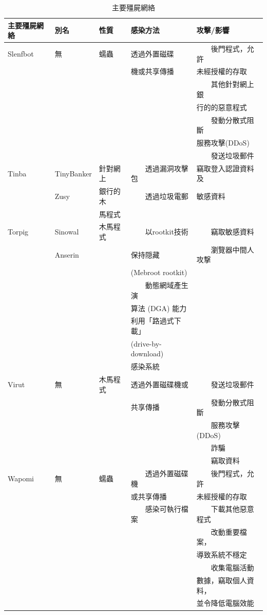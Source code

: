 \documentclass[14pt]{extarticle}
\newcommand{\tabitem}{~~\llap{\textbullet}~~}
\begin{document}
\begin{table}[!htbp]
\centering
\caption{主要殭屍網絡}
\begin{tabular}{lllll} \hline
\bf 主要殭屍網絡 & \bf 別名 & \bf 性質 & \bf 感染方法 & \bf 攻擊/影響\\\hline
Slenfbot &	無 &	蠕蟲	& 透過外置磁碟 & \tabitem 後門程式，允許 \\
 &&& 機或共享傳播 &未經授權的存取\\
  &&&& \tabitem 其他針對網上銀\\
  &&&& 行的的惡意程式\\
&&&& \tabitem 發動分散式阻斷 \\
&&&& 服務攻擊(DDoS) \\
&&&& \tabitem 發送垃圾郵件 \\\hline
Tinba	&	TinyBanker & 針對網上 & \tabitem 透過漏洞攻擊包 & 竊取登入認證資料及 \\
&	Zusy& 	銀行的木 & \tabitem 透過垃圾電郵 & 敏感資料 \\
& & 馬程式 \\\hline
Torpig	&	Sinowal &木馬程式 & \tabitem 以rootkit技術 & \tabitem 竊取敏感資料 \\
& Anserin	& & 保持隠藏 & \tabitem 瀏覽器中間人攻撃 \\
& & & (Mebroot rootkit)\\
& & & \tabitem 動態網域產生演 \\
& & & 算法 (DGA) 能力\\
&&& 利用「路過式下載」\\
&&& (drive-by-download) \\
&&& 感染系統	\\\hline
Virut & 無	& 木馬程式	& 透過外置磁碟機或 & \tabitem 發送垃圾郵件 \\
 &&& 共享傳播 & \tabitem 發動分散式阻斷 \\
&&&& \tabitem 服務攻擊(DDoS) \\
&&&& \tabitem	詐騙 \\
&&&& \tabitem 竊取資料 \\\hline	
Wapomi	& 無	& 蠕蟲	& \tabitem 透過外置磁碟機& \tabitem 後門程式，允許 \\
 &&& 或共享傳播 & 未經授權的存取 \\
&&& \tabitem 感染可執行檔案 & \tabitem 下載其他惡意程式 \\
&&&& \tabitem 改動重要檔案，\\
&&&& 導致系統不穩定\\
&&&&\tabitem 收集電腦活動\\
&&&& 數據，竊取個人資料，\\
&&&& 並令降低電腦效能\\\hline

\end{tabular}
\end{table}
\end{document}

